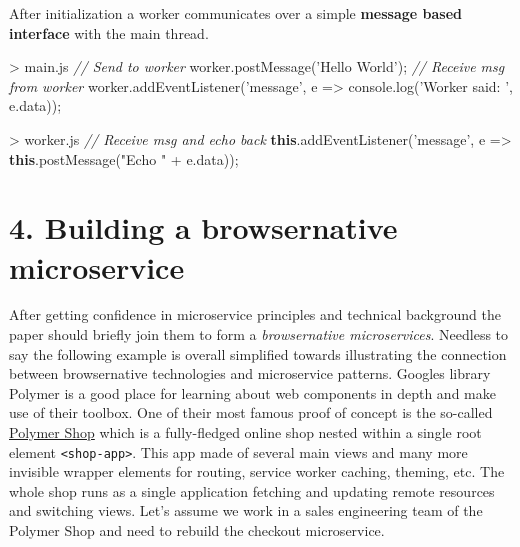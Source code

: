 \documentclass[]{article}
\newenvironment{Shaded}{}{}
\newcommand{\KeywordTok}[1]{\textcolor[rgb]{0.00,0.44,0.13}{\textbf{{#1}}}}
\newcommand{\StringTok}[1]{\textcolor[rgb]{0.25,0.44,0.63}{{#1}}}
\newcommand{\CommentTok}[1]{\textcolor[rgb]{0.38,0.63,0.69}{\textit{{#1}}}}
\newcommand{\VariableTok}[1]{\textcolor[rgb]{0.10,0.09,0.49}{{#1}}}
\newcommand{\OperatorTok}[1]{\textcolor[rgb]{0.40,0.40,0.40}{{#1}}}
\newcommand{\AttributeTok}[1]{\textcolor[rgb]{0.49,0.56,0.16}{{#1}}}
\newcommand{\NormalTok}[1]{{#1}}
\begin{document}
After initialization a worker communicates over a simple \textbf{message
based interface} with the main thread.

\begin{Shaded}
\begin{Highlighting}[]
\OperatorTok{>} \VariableTok{main}\NormalTok{.}\AttributeTok{js}
\CommentTok{// Send to worker}
\VariableTok{worker}\NormalTok{.}\AttributeTok{postMessage}\NormalTok{(}\StringTok{'Hello World'}\NormalTok{)}\OperatorTok{;}
\CommentTok{// Receive msg from worker}
\VariableTok{worker}\NormalTok{.}\AttributeTok{addEventListener}\NormalTok{(}\StringTok{'message'}\OperatorTok{,} \NormalTok{e }\OperatorTok{=>}
 \VariableTok{console}\NormalTok{.}\AttributeTok{log}\NormalTok{(}\StringTok{'Worker said: '}\OperatorTok{,} \VariableTok{e}\NormalTok{.}\AttributeTok{data}\NormalTok{))}\OperatorTok{;}
\end{Highlighting}
\end{Shaded}

\begin{Shaded}
\begin{Highlighting}[]
\OperatorTok{>} \VariableTok{worker}\NormalTok{.}\AttributeTok{js}
\CommentTok{// Receive msg and echo back}
\KeywordTok{this}\NormalTok{.}\AttributeTok{addEventListener}\NormalTok{(}\StringTok{'message'}\OperatorTok{,} \NormalTok{e }\OperatorTok{=>}
 \KeywordTok{this}\NormalTok{.}\AttributeTok{postMessage}\NormalTok{(}\StringTok{"Echo "} \OperatorTok{+} \VariableTok{e}\NormalTok{.}\AttributeTok{data}\NormalTok{))}\OperatorTok{;}
\end{Highlighting}
\end{Shaded}

\section{4. Building a browsernative
microservice}\label{building-a-browsernative-microservice}

After getting confidence in microservice principles and technical
background the paper should briefly join them to form a
\emph{browsernative microservices}. Needless to say the following
example is overall simplified towards illustrating the connection
between browsernative technologies and microservice patterns. Googles
library Polymer is a good place for learning about web components in
depth and make use of their toolbox. One of their most famous proof of
concept is the so-called
\href{https://shop.polymer-project.org/}{Polymer Shop} which is a
fully-fledged online shop nested within a single root element
\texttt{\textless{}shop-app\textgreater{}}. This app made of several
main views and many more invisible wrapper elements for routing, service
worker caching, theming, etc. The whole shop runs as a single
application fetching and updating remote resources and switching views.
Let's assume we work in a sales engineering team of the Polymer Shop and
need to rebuild the checkout microservice.
\end{document}
